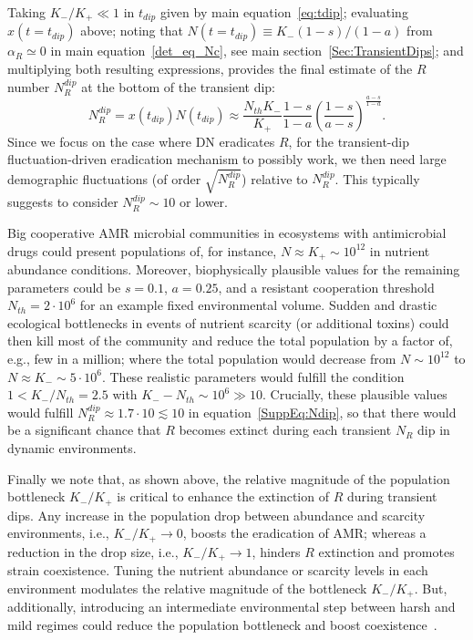 \documentclass{article}
\begin{document}
Taking \(K_{-}/K_{+}\ll1\) in \(t_{dip}\) given by main equation~\eqref{eq:tdip}; evaluating \(x\left(t=t_{dip}\right)\) above; noting that \(N\left(t=t_{dip}\right)\equiv K_{-}(1-s)/(1-a)\) from $\alpha_R\simeq 0$ in main equation~\eqref{det_eq_Nc}, see main section~\ref{Sec:TransientDips}; and multiplying both resulting expressions, provides the final estimate of the $R$ number \(N_{R}^{dip}\) at the bottom of the transient dip:
\begin{equation}
    N_{R}^{dip}=x\left(t_{dip}\right)N\left(t_{dip}\right)\approx\frac{N_{th}K_{-}}{K_{+}}\frac{1-s}{1-a}\left(\frac{1-s}{a-s}\right)^{\frac{a-s}{1-a}}.
\label{SuppEq:Ndip}
\end{equation}
Since we focus on the case where DN eradicates $R$, for the transient-dip fluctuation-driven eradication mechanism to possibly work, we then need large demographic fluctuations (of order \(\sqrt{N_R^{dip}}\)) relative to \(N_R^{dip}\). This typically suggests to consider \(N_R^{dip}\sim10\) or lower.

Big cooperative AMR microbial communities in ecosystems with antimicrobial drugs could present populations of, for instance, \(N\approx K_{+}\sim10^{12}\) in nutrient abundance conditions. Moreover, biophysically plausible values for the remaining parameters could be \(s=0.1\), \(a=0.25\), and a resistant cooperation threshold \(N_{th}=2\cdot10^{6}\) for an example fixed environmental volume. Sudden and drastic ecological bottlenecks in events of nutrient scarcity (or additional toxins) could then kill most of the community and reduce the total population by a factor of, e.g., few in a million; where the total population would decrease from \(N\sim10^{12}\) to \(N\approx K_{-}\sim5\cdot10^{6}\). These realistic parameters would fulfill the condition \(1<K_{-}/N_{th}=2.5\) with \(K_{-}-N_{th}\sim10^{6}\gg10\). Crucially, these plausible values would fulfill \(N_{R}^{dip}\approx1.7\cdot10\lesssim10\) in equation~\eqref{SuppEq:Ndip}, so that there would be a significant chance that $R$ becomes extinct during each transient $N_R$ dip in dynamic environments.

Finally we note that, as shown above, the relative magnitude of the population bottleneck \(K_{-}/K_{+}\) is critical to enhance the extinction of $R$ during transient dips. Any increase in the population drop between abundance and scarcity environments, i.e., \(K_{-}/K_{+}\rightarrow0\), boosts the eradication of AMR; whereas a reduction in the drop size, i.e., \(K_{-}/K_{+}\rightarrow1\), hinders $R$ extinction and promotes strain coexistence. Tuning the nutrient abundance or scarcity levels in each environment modulates the relative magnitude of the bottleneck \(K_{-}/K_{+}\). But, additionally, introducing an intermediate environmental step between harsh and mild regimes could reduce the population bottleneck and boost coexistence~\cite{sanchez2013feedback}.
\end{document}
